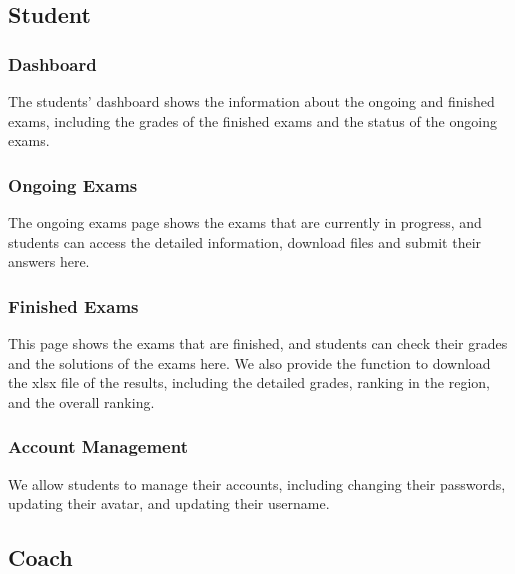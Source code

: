 \documentclass[12pt]{article}
\begin{document}
\subsection{Student}
\subsubsection{Dashboard}
The students' dashboard shows the information about the ongoing and finished exams, including the grades of the finished exams and the status of the ongoing exams.
\subsubsection{Ongoing Exams}
The ongoing exams page shows the exams that are currently in progress, and students can access the detailed information,
download files and submit their answers here.
\subsubsection{Finished Exams}
This page shows the exams that are finished, and students can check their grades and the solutions of the exams here.
We also provide the function to download the xlsx file of the results, including the detailed grades, ranking in the region, and the overall ranking.
\subsubsection{Account Management}
We allow students to manage their accounts, including changing their passwords, updating their avatar, and updating their username.
\subsection{Coach}
\end{document}
